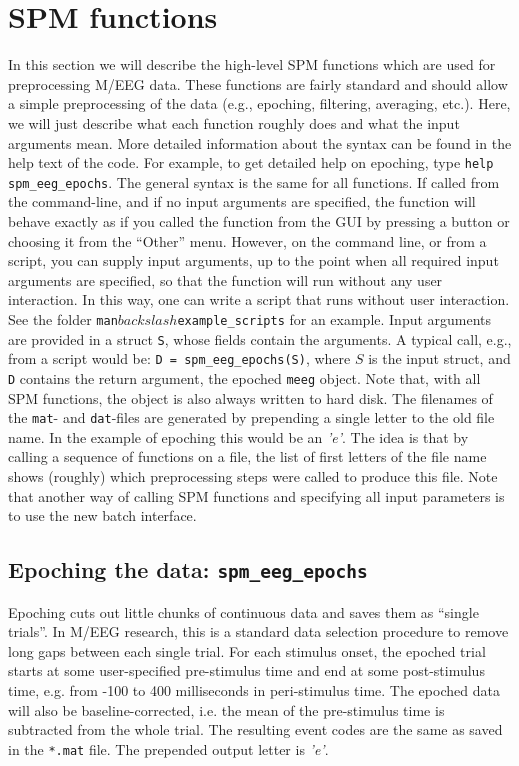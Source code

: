 \section{SPM functions}
In this section we will describe the high-level SPM functions which are used for preprocessing M/EEG data. These functions are fairly standard and should allow a simple preprocessing of the data (e.g., epoching, filtering, averaging, etc.). Here, we will just describe what each function roughly does and what the input arguments mean. More detailed information about the syntax can be found in the help text of the code. For example, to get detailed help on epoching, type \texttt{help spm\_eeg\_epochs}. The general syntax is the same for all functions. If called from the command-line, and if no input arguments are specified, the function will behave exactly as if you called the function from the GUI by pressing a button or choosing it from the ``Other'' menu. However, on the command line, or from a script, you can supply input arguments, up to the point when all required input arguments are specified, so that the function will run without any user interaction. In this way, one can write a script that runs without user interaction. See the folder \texttt{man$backslash$example\_scripts} for an example. Input arguments are provided in a struct \texttt{S}, whose fields contain the arguments. A typical call, e.g., from a script would be: \texttt{D = spm\_eeg\_epochs(S)}, where $S$ is the input struct, and \texttt{D} contains the return argument, the epoched \texttt{meeg} object. Note that, with all SPM functions, the object is also always written to hard disk. The filenames of the \texttt{mat}- and \texttt{dat}-files are generated by prepending a single letter to the old file name. In the example of epoching this would be an \textit{'e'}. The idea is that by calling a sequence of functions on a file, the list of first letters of the file name shows (roughly) which preprocessing steps were called to produce this file. Note that another way of calling SPM functions and specifying all input parameters is to use the new batch interface.

\subsection{Epoching the data: \texttt{spm\_eeg\_epochs}}
Epoching cuts out little chunks of continuous data and saves them as ``single trials''. In M/EEG research, this is a standard data selection procedure to remove long gaps between each single trial. For each stimulus onset, the epoched trial starts at some user-specified pre-stimulus time and end at some post-stimulus time, e.g. from -100 to 400 milliseconds in peri-stimulus time. The epoched data will also be baseline-corrected, i.e. the mean of the pre-stimulus time is subtracted from the whole trial. The resulting event codes are the same as saved in the \texttt{*.mat} file. The prepended output letter is \textit{'e'}.

